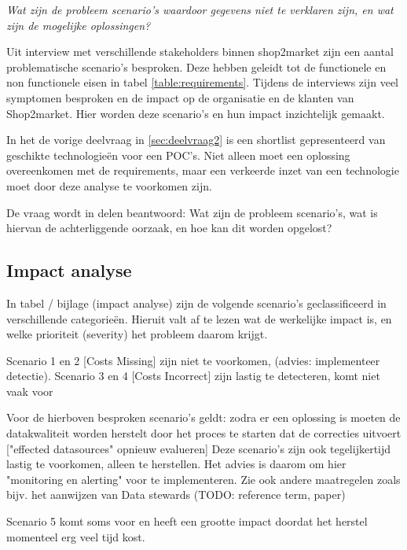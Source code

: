 \textit{Wat zijn de probleem scenario's waardoor gegevens niet te verklaren zijn, en wat zijn de mogelijke oplossingen?}

Uit interview met verschillende stakeholders binnen shop2market zijn een aantal problematische scenario's besproken. Deze hebben geleidt tot de functionele en non functionele eisen in tabel \ref{table:requirements}. Tijdens de interviews zijn veel symptomen besproken en de impact op de organisatie en de klanten van Shop2market. Hier worden deze scenario's en hun impact inzichtelijk gemaakt.

In het de vorige deelvraag in \ref{sec:deelvraag2} is een shortlist gepresenteerd van geschikte technologieën voor een POC's.
Niet alleen moet een oplossing overeenkomen met de requirements, maar een verkeerde inzet van een technologie moet door deze analyse te voorkomen zijn.

De vraag wordt in delen beantwoord: Wat zijn de probleem scenario's, wat is hiervan de achterliggende oorzaak, en hoe kan dit worden opgelost?


\subsection{Impact analyse}

In tabel / bijlage (impact analyse) zijn de volgende scenario's geclassificeerd in verschillende categorieën. Hieruit valt af te lezen wat de werkelijke impact is, en welke prioriteit (severity) het probleem daarom krijgt.


Scenario 1 en 2 [Costs Missing] zijn niet te voorkomen, (advies: implementeer detectie). Scenario 3 en 4 [Costs Incorrect] zijn lastig te detecteren, komt niet vaak voor

Voor de hierboven besproken scenario's geldt: zodra er een oplossing is moeten de datakwaliteit worden herstelt door het proces te starten dat de correcties uitvoert ["effected datasources" opnieuw evalueren]
Deze scenario's zijn ook tegelijkertijd lastig te voorkomen, alleen te herstellen. Het advies is daarom om hier "monitoring en alerting" voor te implementeren. Zie ook andere maatregelen zoals bijv. het aanwijzen van Data stewards (TODO: reference term, paper)

Scenario 5 komt soms voor en heeft een grootte impact doordat het herstel momenteel erg veel tijd kost.


